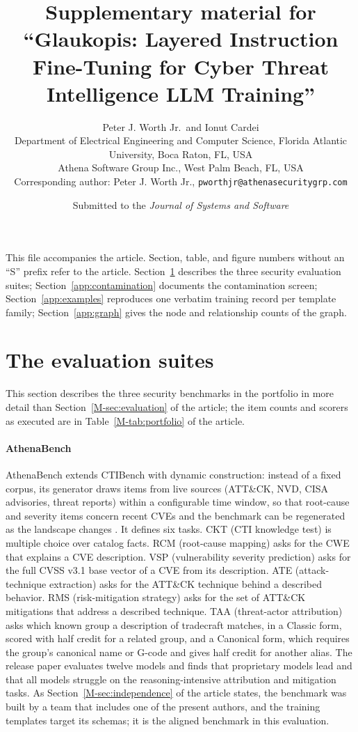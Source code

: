 \documentclass[11pt,a4paper]{article}
\title{Supplementary material for\\``Glaukopis: Layered Instruction Fine-Tuning for Cyber Threat Intelligence LLM Training''}
\author{Peter J. Worth Jr.\ and Ionut Cardei\\[2pt]
\small Department of Electrical Engineering and Computer Science, Florida Atlantic University, Boca Raton, FL, USA\\
\small Athena Software Group Inc., West Palm Beach, FL, USA\\
\small Corresponding author: Peter J. Worth Jr., \texttt{pworthjr@athenasecuritygrp.com}}
\date{Submitted to the \emph{Journal of Systems and Software}}
\begin{document}
\maketitle

\noindent This file accompanies the article. Section, table, and figure numbers without an ``S'' prefix refer to the article. Section~\ref{app:benchmarks} describes the three security evaluation suites; Section~\ref{app:contamination} documents the contamination screen; Section~\ref{app:examples} reproduces one verbatim training record per template family; Section~\ref{app:graph} gives the node and relationship counts of the graph.

\section{The evaluation suites}\label{app:benchmarks}
This section describes the three security benchmarks in the portfolio in more detail than Section~\ref{M-sec:evaluation} of the article; the item counts and scorers as executed are in Table~\ref{M-tab:portfolio} of the article.

\paragraph{AthenaBench}
AthenaBench extends CTIBench \citep{alam2024ctibench} with dynamic construction: instead of a fixed corpus, its generator draws items from live sources (ATT\&CK, NVD, CISA advisories, threat reports) within a configurable time window, so that root-cause and severity items concern recent CVEs and the benchmark can be regenerated as the landscape changes \citep{alam2025athenabench}. It defines six tasks. CKT (CTI knowledge test) is multiple choice over catalog facts. RCM (root-cause mapping) asks for the CWE that explains a CVE description. VSP (vulnerability severity prediction) asks for the full CVSS v3.1 base vector of a CVE from its description. ATE (attack-technique extraction) asks for the ATT\&CK technique behind a described behavior. RMS (risk-mitigation strategy) asks for the set of ATT\&CK mitigations that address a described technique. TAA (threat-actor attribution) asks which known group a description of tradecraft matches, in a Classic form, scored with half credit for a related group, and a Canonical form, which requires the group's canonical name or G-code and gives half credit for another alias. The release paper evaluates twelve models and finds that proprietary models lead and that all models struggle on the reasoning-intensive attribution and mitigation tasks. As Section~\ref{M-sec:independence} of the article states, the benchmark was built by a team that includes one of the present authors, and the training templates target its schemas; it is the aligned benchmark in this evaluation.
\end{document}
